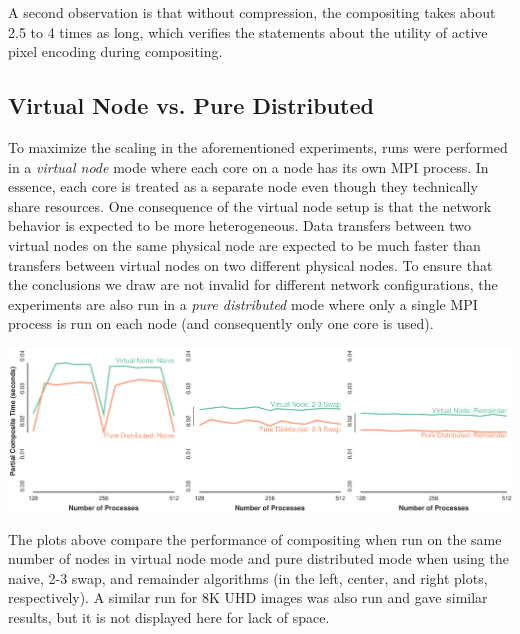 \documentclass{vgtc}                          %
\newcommand*{\keyterm}[1]{\emph{#1}}
\newcommand*{\textalgorithm}[1]{\textsf{#1}\xspace}
\newcommand{\ttswap}{\textalgorithm{2-3 swap}}
\newcommand{\naive}{\textalgorithm{naive}}
\newcommand{\remainder}{\textalgorithm{remainder}}
\begin{document}
A second observation is that without compression, the compositing takes about 2.5 to 4 times as long, which verifies the statements about the utility of active pixel encoding during compositing.

\subsection{Virtual Node vs. Pure Distributed}
\label{sec:VNCompare}

To maximize the scaling in the aforementioned experiments, runs were performed in a \keyterm{virtual node} mode where each core on a node has its own MPI process.
In essence, each core is treated as a separate node even though they technically share resources.
One consequence of the virtual node setup is that the network behavior is expected to be more heterogeneous.
Data transfers between two virtual nodes on the same physical node are expected to be much faster than transfers between virtual nodes on two different physical nodes.
To ensure that the conclusions we draw are not invalid for different network configurations, the experiments are also run in a \keyterm{pure distributed} mode where only a single MPI process is run on each node (and consequently only one core is used).

\noindent
\includegraphics[width=\linewidth]{vn-vs-smp-hdtv}

The plots above compare the performance of compositing when run on the same number of nodes in virtual node mode and pure distributed mode when using the \naive, \ttswap, and \remainder algorithms (in the left, center, and right plots, respectively).
A similar run for 8K UHD images was also run and gave similar results, but it is not displayed here for lack of space.
\end{document}
